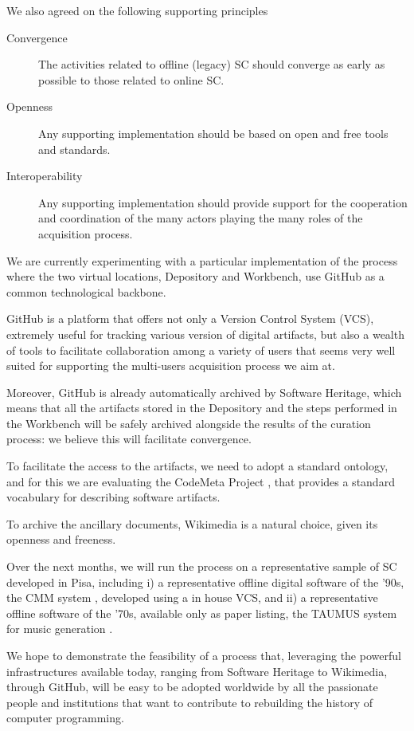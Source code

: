 \documentclass[a4paper]{article}
\begin{document}
We also agreed on the following supporting principles

\begin{description}
	\item[Convergence] The activities related to offline (legacy) SC should converge as early as possible to those related to online SC.
	\item[Openness] Any supporting implementation should be 
	based on open and free tools and standards.
	\item[Interoperability] Any supporting implementation should provide support for 
the cooperation and coordination of the many actors playing the many roles of the acquisition process.	
\end{description}

\noindent
We are currently experimenting with a particular implementation of the process where the two virtual locations, Depository and Workbench, use GitHub as a common technological backbone.

GitHub is a platform that offers not only a Version Control System (VCS), extremely
useful for tracking various version of digital artifacts, but also a wealth of
tools to facilitate collaboration among a variety of users that seems very well
suited for supporting the multi-users acquisition process we aim at.

Moreover, GitHub is already automatically archived by Software Heritage, which
means that all the artifacts stored in the Depository and the steps performed in
the Workbench will be safely archived alongside the results of the curation process: we believe this will facilitate convergence.

To facilitate the access to the artifacts, we need to adopt a standard ontology, and for this we are evaluating the CodeMeta Project \cite{CodeMeta}, that provides a standard vocabulary for describing software artifacts.

\noindent
To archive the ancillary documents, Wikimedia \cite{wiki:Wikimedia_movement} is a natural choice, given its openness and freeness.  

Over the next months, we will run the process on a representative sample of SC
developed in Pisa,  including i) a representative offline digital software of the '90s, the CMM system \cite{CMM:1994}, developed using a in house VCS, and ii) a representative offline software of the '70s, available only as paper listing, the TAUMUS system for music generation \cite{TAU2:1976}.

We hope to demonstrate the feasibility of a process that, leveraging the
powerful infrastructures available today, ranging from Software Heritage to
Wikimedia, through GitHub, will be easy to be adopted worldwide by all the
passionate people and institutions that want to contribute to rebuilding
the history of computer programming.
\end{document}
